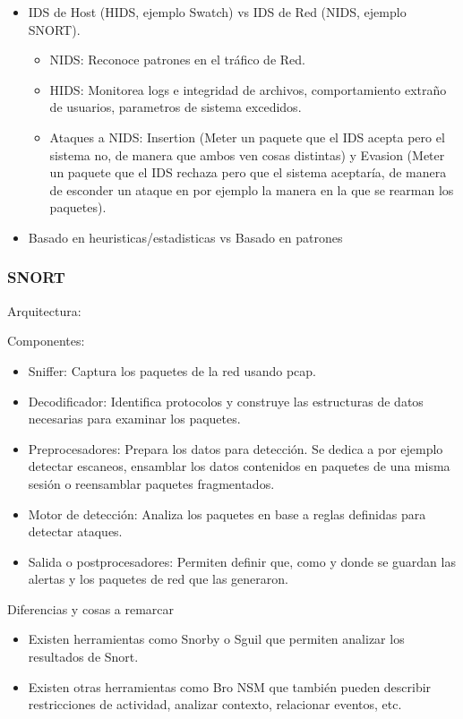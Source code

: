 \begin{itemize}
\begin{itemize}
		\item IDS de Host (HIDS, ejemplo Swatch) vs IDS de Red (NIDS, ejemplo SNORT). \begin{itemize}
			\item NIDS: Reconoce patrones en el tráfico de Red.
			\item HIDS: Monitorea logs e integridad de archivos, comportamiento extraño de usuarios, parametros de sistema excedidos.
			\item Ataques a NIDS: Insertion (Meter un paquete que el IDS acepta pero el sistema no, de manera que ambos ven cosas distintas) y
			Evasion (Meter un paquete que el IDS rechaza pero que el sistema aceptaría, de manera de esconder un ataque en por ejemplo la manera en la
			que se rearman los paquetes).
		\end{itemize}
		\item Basado en heuristicas/estadisticas vs Basado en patrones
	\end{itemize}
\end{itemize}

\subsubsection{SNORT}

Arquitectura: 


Componentes:

\begin{itemize}
	\item Sniffer: Captura los paquetes de la red usando pcap.
	\item Decodificador: Identifica protocolos y construye las estructuras de datos necesarias para examinar los paquetes.
	\item Preprocesadores: Prepara los datos para detección. Se dedica a por ejemplo detectar escaneos, ensamblar los datos
	contenidos en paquetes de una misma sesión o reensamblar paquetes fragmentados.
	\item Motor de detección: Analiza los paquetes en base a reglas definidas para detectar ataques.
	\item Salida o postprocesadores: Permiten definir que, como y donde se guardan las alertas y los paquetes de red que las
	generaron.
\end{itemize}

Diferencias y cosas a remarcar

\begin{itemize}
	\item Existen herramientas como Snorby o Sguil que permiten analizar los resultados de Snort.
	\item Existen otras herramientas como Bro NSM que también pueden describir restricciones de actividad, analizar contexto,
	relacionar eventos, etc.
\end{itemize}

